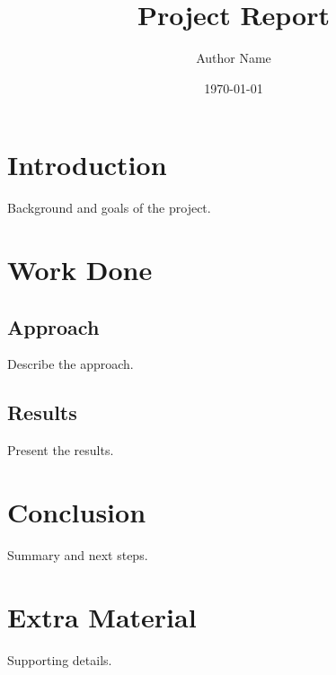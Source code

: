 \documentclass[12pt]{report}
\title{Project Report}
\author{Author Name}
\date{\today}
\begin{document}
\maketitle
\tableofcontents

\chapter{Introduction}
Background and goals of the project.

\chapter{Work Done}
\section{Approach}
Describe the approach.
\section{Results}
Present the results.

\chapter{Conclusion}
Summary and next steps.

\appendix
\chapter{Extra Material}
Supporting details.
\end{document}
